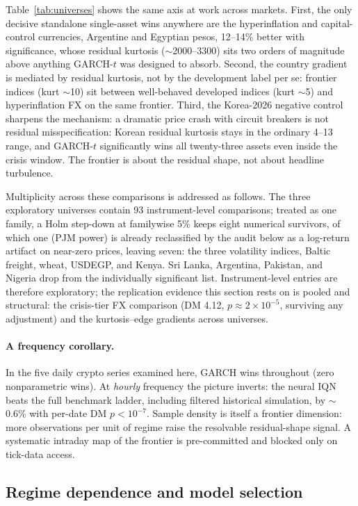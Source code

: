 \documentclass[11pt]{article}
\theoremstyle{remark}
\begin{document}
Table~\ref{tab:universes} shows the same axis at work across markets.
First, the only decisive
standalone single-asset wins anywhere are the hyperinflation and capital-control currencies, Argentine and Egyptian pesos, 12--14\%
better with significance, whose residual kurtosis ($\sim$2000--3300)
sits two orders of magnitude above anything GARCH-$t$ was designed to
absorb. Second, the country gradient is mediated by residual kurtosis,
not by the development label per se: frontier indices (kurt $\sim$10)
sit between well-behaved developed indices (kurt $\sim$5) and
hyperinflation FX on the same frontier. Third, the Korea-2026 negative
control sharpens the mechanism: a dramatic price crash with
circuit breakers is not residual misspecification: Korean residual kurtosis stays in the ordinary 4--13 range, and GARCH-$t$
significantly wins all twenty-three assets even inside the crisis
window. The frontier is about the residual shape, not about headline
turbulence.

Multiplicity across these comparisons is addressed as follows. The three
exploratory universes contain 93 instrument-level comparisons; treated
as one family, a Holm step-down at familywise 5\% keeps eight numerical survivors, of which one (PJM power)
is already reclassified by the audit below as a log-return artifact on
near-zero prices, leaving seven: the three volatility indices, Baltic
freight, wheat, USDEGP, and Kenya. Sri Lanka, Argentina, Pakistan, and
Nigeria drop from the individually significant list. Instrument-level
entries are therefore exploratory; the replication evidence this
section rests on is pooled and structural: the crisis-tier FX
comparison (DM 4.12, $p\approx2\times10^{-5}$, surviving any
adjustment) and the kurtosis--edge gradients across universes.

\paragraph{A frequency corollary.} In the five daily crypto series examined here, GARCH wins throughout (zero
nonparametric wins). At \emph{hourly} frequency the
picture inverts: the neural IQN beats the full benchmark ladder,
including filtered historical simulation, by $\sim$0.6\% with per-date
DM $p < 10^{-7}$. Sample density is itself a frontier dimension: more
observations per unit of regime raise the resolvable residual-shape
signal. A systematic intraday map of the frontier is pre-committed and
blocked only on tick-data access.

\subsection{Regime dependence and model selection}
\label{sec:gate}
\end{document}
